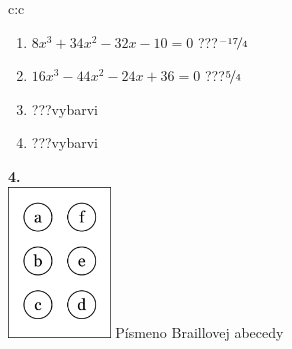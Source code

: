 \documentclass[10pt]{report}
\begin{document}
\begin{tabular}{c:c}
\begin{minipage}[c][99mm][t]{0.49\linewidth}
\begin{center}
\begin{minipage}{0.77\linewidth}
\begin{center}
\begin{varwidth}{\textwidth}
\begin{enumerate}
\item $8x^3+34x^2-32x-10=0$\quad \dotfill\; ???\;\dotfill \quad $\nicefrac{-17}{4}$
\item $16x^3-44x^2-24x+36=0$\quad \dotfill\; ???\;\dotfill \quad $\nicefrac{5}{4}$
\item \quad \dotfill\; ???\;\dotfill \quad vybarvi
\item \quad \dotfill\; ???\;\dotfill \quad vybarvi
\end{enumerate}
\end{varwidth}
\end{center}
\end{minipage}
\begin{minipage}{0.20\linewidth}
\begin{center}
{\Huge\bfseries 4.} \\[2mm]
\includegraphics[height=40mm]{../images/braille.png}
{\small Písmeno Braillovej abecedy}
\end{center}
\end{minipage}
\end{center}
\end{minipage}

\end{tabular}
\clearpage
\thispagestyle{empty}
\end{document}
